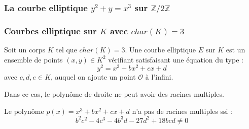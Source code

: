 \documentclass[9pt]{beamer}
\begin{document}
\begin{frame}
    \frametitle{La courbe elliptique $y^2 + y = x^3$ sur $\mathbb{Z}/2\mathbb{Z}$}
    \begin{figure}
    \end{figure}
\end{frame}

\begin{frame}
    \frametitle{Courbes elliptique sur $K$ avec $char(K) = 3$}
    \begin{df}
        Soit un corps $K$ tel que $char(K) = 3$. Une courbe elliptique $E$ sur $K$ est un
        ensemble de points $(x,y) \in K^2$ vérifiant satisfaisant une équation du type :
        \[
            y^2 = x^3 + bx^2 + cx + d
        \]
        avec $c, d, e \in K$, auquel on ajoute un point $\mathcal{O}$ à l'infini.
    \end{df}

    \begin{rmq}
        Dans ce cas, le polynôme de droite ne peut avoir des racines multiples.
    \end{rmq}

    \begin{rmq}
        Le polynôme $p(x) = x^3 + bx^2 + cx + d$ n'a pas de racines multiples ssi : \[
            b^2c^2 - 4 c^3 - 4b^3d - 27d^2 + 18 bcd \neq 0
        \]
    \end{rmq}
\end{frame}
\end{document}
